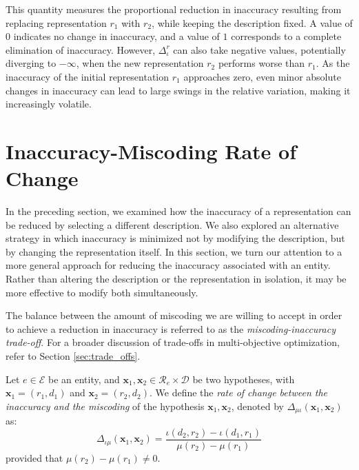 This quantity measures the proportional reduction in inaccuracy resulting from replacing representation $r_1$ with $r_2$, while keeping the description fixed. A value of $0$ indicates no change in inaccuracy, and a value of $1$ corresponds to a complete elimination of inaccuracy. However, $\Delta^{r}_{\iota}$ can also take negative values, potentially diverging to $-\infty$, when the new representation $r_2$ performs worse than $r_1$. As the inaccuracy of the initial representation $r_1$ approaches zero, even minor absolute changes in inaccuracy can lead to large swings in the relative variation, making it increasingly volatile.

%
%

\section{Inaccuracy-Miscoding Rate of Change}
\label{sec:Inaccuracy_Miscoding_Rate_of_Change}

In the preceding section, we examined how the inaccuracy of a representation can be reduced by selecting a different description. We also explored an alternative strategy in which inaccuracy is minimized not by modifying the description, but by changing the representation itself. In this section, we turn our attention to a more general approach for reducing the inaccuracy associated with an entity. Rather than altering the description or the representation in isolation, it may be more effective to modify both simultaneously.

The balance between the amount of miscoding we are willing to accept in order to achieve a reduction in inaccuracy is referred to as the \emph{miscoding-inaccuracy trade-off}. For a broader discussion of trade-offs in multi-objective optimization, refer to Section \ref{sec:trade_offs}.

\begin{definition}
Let $e \in \mathcal{E}$ be an entity, and $\mathbf{x}_1, \mathbf{x}_2 \in \mathcal{R}_e \times \mathcal{D}$ be two hypotheses, with $\mathbf{x}_1 = (r_1, d_1)$ and $\mathbf{x}_2 = (r_2, d_2)$. We define the \emph{rate of change between the inaccuracy and the miscoding} of the hypothesis $\mathbf{x}_1, \mathbf{x}_2$, denoted by $\Delta_{\mu \iota} ( \mathbf{x}_1, \mathbf{x}_2 )$ as:
\[
\Delta_{\iota \mu} ( \mathbf{x}_1, \mathbf{x}_2 ) = \frac{\iota(d_2, r_2) - \iota(d_1, r_1)}{\mu(r_2) - \mu(r_1)}
\] 
provided that $\mu(r_2) - \mu(r_1) \neq 0$.
\end{definition}

